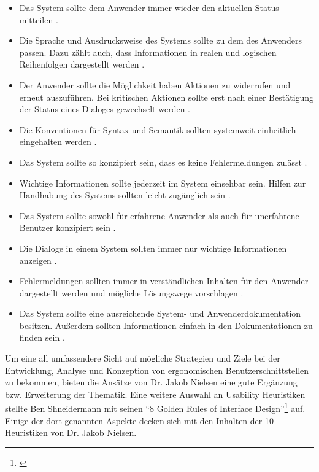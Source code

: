 \begin{itemize}
    \item Das System sollte dem Anwender immer wieder den aktuellen Status mitteilen \citep[vgl.][]{Nielsen1995}.
    \item Die Sprache und Ausdrucksweise des Systems sollte zu dem des Anwenders passen. Dazu zählt auch, dass Informationen in realen und logischen Reihenfolgen dargestellt werden \citep[vgl.][]{Nielsen1995}.
    \item Der Anwender sollte die Möglichkeit haben Aktionen zu widerrufen und erneut auszuführen. Bei kritischen Aktionen sollte erst nach einer Bestätigung der Status eines Dialoges gewechselt werden \citep[vgl.][]{Nielsen1995}.
    \item Die Konventionen für Syntax und Semantik sollten systemweit einheitlich eingehalten werden \citep[vgl.][]{Nielsen1995}.
    \item Das System sollte so konzipiert sein, dass es keine Fehlermeldungen zulässt \citep[vgl.][]{Nielsen1995}.
    \item Wichtige Informationen sollte jederzeit im System einsehbar sein. Hilfen zur Handhabung des Systems sollten leicht zugänglich sein \citep[vgl.][]{Nielsen1995}.
    \item Das System sollte sowohl für erfahrene Anwender als auch für unerfahrene Benutzer konzipiert sein \citep[vgl.][]{Nielsen1995}.
    \item Die Dialoge in einem System sollten immer nur wichtige Informationen anzeigen \citep[vgl.][]{Nielsen1995}.
    \item Fehlermeldungen sollten immer in verständlichen Inhalten für den Anwender dargestellt werden und mögliche Lösungswege vorschlagen \citep[vgl.][]{Nielsen1995}.
    \item Das System sollte eine ausreichende System- und Anwenderdokumentation besitzen. Außerdem sollten Informationen einfach in den Dokumentationen zu finden sein \citep[vgl.][]{Nielsen1995}.
\end{itemize}

Um eine all umfassendere Sicht auf mögliche Strategien und Ziele bei der Entwicklung, Analyse und Konzeption von ergonomischen Benutzerschnittstellen zu bekommen, bieten die Ansätze von Dr. Jakob Nielsen eine gute Ergänzung bzw. Erweiterung der Thematik. Eine weitere Auswahl an Usability Heuristiken stellte Ben Shneidermann mit seinen \enquote{8 Golden Rules of Interface Design}\footnote{\cite{Wong2018}} auf. Einige der dort genannten Aspekte decken sich mit den Inhalten der 10 Heuristiken von Dr. Jakob Nielsen.

